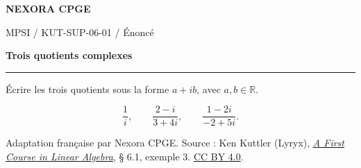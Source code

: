 \documentclass[11pt,a4paper]{article}
\begin{document}
{\small\bfseries\color{nexorablue} NEXORA CPGE}\par
{\small MPSI / KUT-SUP-06-01 / Énoncé}\par
{\LARGE\bfseries Trois quotients complexes}\par
\vspace{0.25em}\hrule\vspace{0.6em}

Écrire les trois quotients sous la forme $a+ib$, avec $a,b\in\mathbb R$.

\[ \frac{1}{i},\qquad \frac{2-i}{3+4i},\qquad \frac{1-2i}{-2+5i}. \]

\bigskip
{\footnotesize Adaptation française par Nexora CPGE. Source : Ken Kuttler (Lyryx),
\href{https://math.libretexts.org/Bookshelves/Linear_Algebra/A_First_Course_in_Linear_Algebra_(Kuttler)/06\%253A_Complex_Numbers/6.01\%253A_Complex_Numbers}{\textit{A First Course in Linear Algebra}}, § 6.1, exemple 3.
\href{https://creativecommons.org/licenses/by/4.0/}{CC BY 4.0}.}
\end{document}
